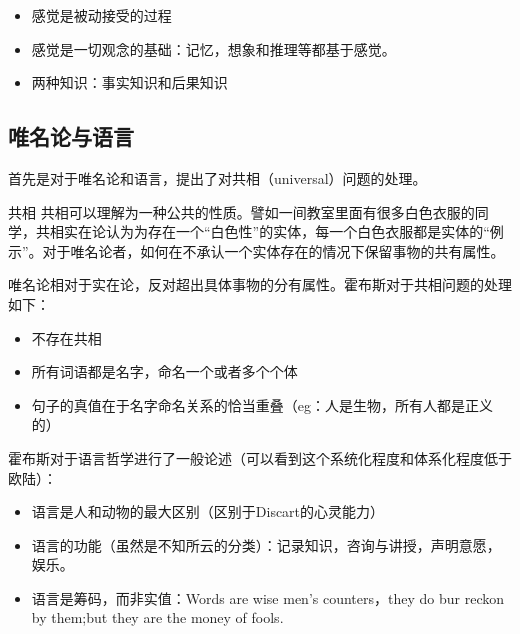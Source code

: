 \documentclass{ctexart}
\begin{document}
\begin{itemize}
    \item 感觉是被动接受的过程
    \item 感觉是一切观念的基础：记忆，想象和推理等都基于感觉。
    \item 两种知识：事实知识和后果知识
\end{itemize}

\subsection{唯名论与语言}

首先是对于唯名论和语言，提出了对共相（universal）问题的处理。

\begin{fancybox}{共相}
    共相可以理解为一种公共的性质。譬如一间教室里面有很多白色衣服的同学，共相实在论认为为存在一个“白色性”的实体，每一个白色衣服都是实体的“例示”。对于唯名论者，如何在不承认一个实体存在的情况下保留事物的共有属性。
\end{fancybox}

唯名论相对于实在论，反对超出具体事物的分有属性。霍布斯对于共相问题的处理如下：

\begin{itemize}
    \item 不存在共相
    \item 所有词语都是名字，命名一个或者多个个体
    \item 句子的真值在于名字命名关系的恰当重叠（eg：人是生物，所有人都是正义的）
\end{itemize}

霍布斯对于语言哲学进行了一般论述（可以看到这个系统化程度和体系化程度低于欧陆）：

\begin{itemize}
    \item 语言是人和动物的最大区别（区别于Discart的心灵能力）
    \item 语言的功能（虽然是不知所云的分类）：记录知识，咨询与讲授，声明意愿，娱乐。
    \item 语言是筹码，而非实值：Words are wise men’s counters，they do bur reckon by them;but they are the money of fools. 
\end{itemize}
\end{document}
